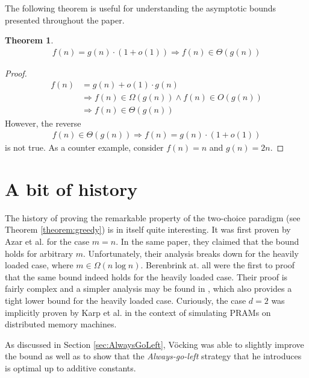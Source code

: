 \documentclass[a4paper,12pt]{article}
\newtheorem{theorem}{Theorem}
\begin{document}
The following theorem is useful for understanding the asymptotic bounds presented throughout the paper.
\begin{theorem}\label{theorem:asymptotic}
\begin{align*}
f(n) = g(n) \cdot (1+o(1)) \Rightarrow f(n) \in \Theta(g(n)) 
\end{align*}
\end{theorem}
\begin{proof}
\begin{align*}
f(n) &= g(n)+o(1)\cdot g(n) \\
&\Rightarrow f(n) \in \Omega(g(n)) \land f(n) \in O(g(n)) \\
&\Rightarrow f(n) \in \Theta(g(n))
\end{align*}
However, the reverse
\begin{align*}
f(n) \in \Theta(g(n)) \Rightarrow f(n) = g(n) \cdot (1+o(1)) 
\end{align*}
is not true. As a counter example, consider $f(n) = n$ and $g(n) = 2n$.
\end{proof}

\section{A bit of history}
\label{sec:historyOfGreedy}
The history of proving the remarkable property of the two-choice paradigm (see Theorem \ref{theorem:greedy}) is in itself quite interesting. It was first proven by Azar et al. \cite{ABKU99} for the case $m = n$. In the same paper, they claimed that the bound holds for arbitrary $m$. Unfortunately, their analysis breaks down for the heavily loaded case, where $m \in \Omega\left(n  \log n\right)$. Berenbrink at. all \cite{BFZR08} were the first to proof that the same bound indeed holds for the heavily loaded case. Their proof is fairly complex and a simpler analysis may be found in \cite{TW13}, which also provides a tight lower bound for the heavily loaded case. Curiously, the case $d = 2$ was implicitly proven by Karp et al. in the context of simulating PRAMs on distributed memory machines\cite{KLM92}.

As discussed in Section \ref{sec:AlwaysGoLeft}, V\"ocking \cite{VOC03} was able to slightly improve the bound as well as to show that the \emph{Always-go-left} strategy that he introduces is optimal up to additive constants.



 
\end{document}
